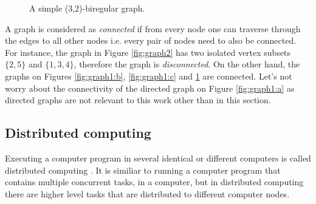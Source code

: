 \begin{figure}[H]
\centering
\caption{A simple (3,2)-biregular graph.\label{fig:graph3}}
\end{figure}


A graph is considered as \emph{connected} if from every node one can traverse through the edges to all other nodes i.e. every pair of nodes need to also be connected.
For instance, the graph in Figure \ref{fig:graph2} has two isolated vertex subsets $\{2, 5\}$ and $\{1, 3, 4\}$, therefore the graph is \emph{disconnected}.
On the other hand, the graphs on Figures \ref{fig:graph1:b}, \ref{fig:graph1:c} and \ref{fig:graph3} are connected.
Let's not worry about the connectivity of the directed graph on Figure \ref{fig:graph1:a} as directed graphs are not relevant to this work other than in this section.


\subsection{Distributed computing} \label{sec:distributed_computing}
Executing a computer program in several identical or different computers is called distributed computing
\cite{DBLP:books/el/leeuwen90/LamportL90}.
It is similiar to running a computer program that contains multiple concurrent tasks, in a computer, but in distributed computing there are higher level tasks that are distributed to different computer nodes.

